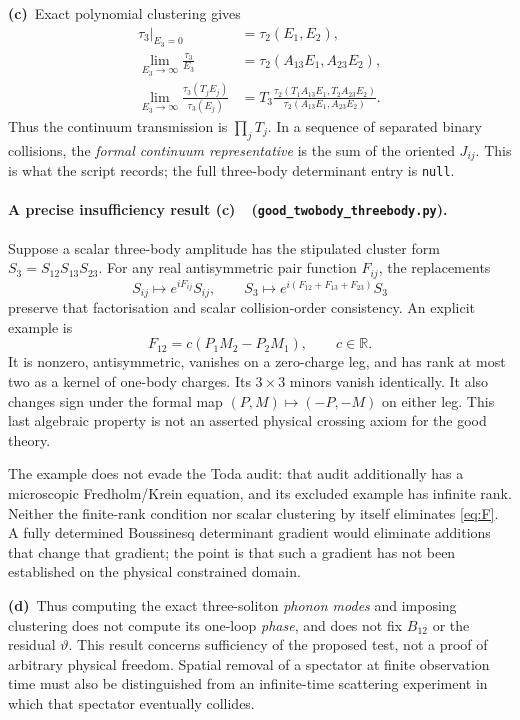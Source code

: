 \documentclass[11pt,a4paper]{article}
\newcommand{\Cc}{\textbf{(c)}\ }
\newcommand{\Cd}{\textbf{(d)}\ }
\newcommand{\file}[1]{\nolinkurl{#1}}
\newcommand{\three}{\file{good_twobody_threebody.py}}
\begin{document}
\Cc Exact polynomial clustering gives
\begin{align}
 \tau_3|_{E_3=0}&=\tau_2(E_1,E_2),\\
 \lim_{E_3\to\infty}\frac{\tau_3}{E_3}
 &=\tau_2(A_{13}E_1,A_{23}E_2),\\
 \lim_{E_3\to\infty}
 \frac{\tau_3(T_jE_j)}{\tau_3(E_j)}
 &=T_3\frac{\tau_2(T_1A_{13}E_1,T_2A_{23}E_2)}
                 {\tau_2(A_{13}E_1,A_{23}E_2)}.
\end{align}
Thus the continuum transmission is \(\prod_jT_j\). In a sequence of
separated binary collisions, the \emph{formal continuum representative}
is the sum of the oriented \(J_{ij}\). This is what the script records;
the full three-body determinant entry is \texttt{null}.

\paragraph{A precise insufficiency result \Cc\ (\three).}
Suppose a scalar three-body amplitude has the stipulated cluster form
\(S_3=S_{12}S_{13}S_{23}\). For any real antisymmetric pair function
\(F_{ij}\), the replacements
\begin{equation}
 S_{ij}\longmapsto e^{iF_{ij}}S_{ij},\qquad
 S_3\longmapsto e^{i(F_{12}+F_{13}+F_{23})}S_3
 \label{eq:pairfreedom}
\end{equation}
preserve that factorisation and scalar collision-order consistency.
An explicit example is
\begin{equation}
 F_{12}=c(P_1M_2-P_2M_1),\qquad c\in\mathbb R.
 \label{eq:F}
\end{equation}
It is nonzero, antisymmetric, vanishes on a zero-charge leg, and has
rank at most two as a kernel of one-body charges. Its \(3\times3\)
minors vanish identically. It also changes sign under the formal map
\((P,M)\mapsto(-P,-M)\) on either leg. This last algebraic property
is not an asserted physical crossing axiom for the good theory.

The example does not evade the Toda audit: that audit additionally has
a microscopic Fredholm/Krein equation, and its excluded example has
infinite rank. Neither the finite-rank condition nor scalar clustering
by itself eliminates \eqref{eq:F}. A fully determined Boussinesq
determinant gradient would eliminate additions that change that gradient;
the point is that such a gradient has not been established on the
physical constrained domain.

\Cd Thus computing the exact three-soliton \emph{phonon modes} and
imposing clustering does not compute its one-loop \emph{phase}, and
does not fix \(B_{12}\) or the residual \(\vartheta\).
This result concerns sufficiency of the proposed test, not a proof of
arbitrary physical freedom. Spatial removal of a spectator at finite
observation time must also be distinguished from an infinite-time
scattering experiment in which that spectator eventually collides.
\end{document}
